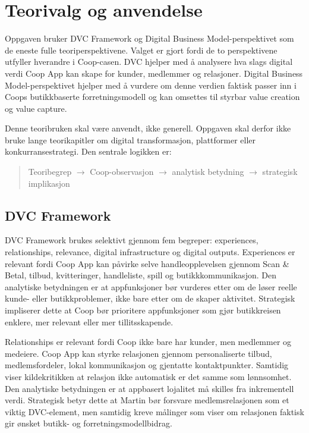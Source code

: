 \documentclass[12pt,a4paper]{article}
\begin{document}
\section{Teorivalg og anvendelse}

Oppgaven bruker DVC Framework og Digital Business Model-perspektivet som de eneste fulle teoriperspektivene. Valget er gjort fordi de to perspektivene utfyller hverandre i Coop-casen. DVC hjelper med å analysere hva slags digital verdi Coop App kan skape for kunder, medlemmer og relasjoner. Digital Business Model-perspektivet hjelper med å vurdere om denne verdien faktisk passer inn i Coops butikkbaserte forretningsmodell og kan omsettes til styrbar value creation og value capture.

Denne teoribruken skal være anvendt, ikke generell. Oppgaven skal derfor ikke bruke lange teorikapitler om digital transformasjon, plattformer eller konkurransestrategi. Den sentrale logikken er:

\begin{quote}
Teoribegrep $\rightarrow$ Coop-observasjon $\rightarrow$ analytisk betydning $\rightarrow$ strategisk implikasjon
\end{quote}

\subsection{DVC Framework}

DVC Framework brukes selektivt gjennom fem begreper: experiences, relationships, relevance, digital infrastructure og digital outputs. Experiences er relevant fordi Coop App kan påvirke selve handleopplevelsen gjennom Scan \& Betal, tilbud, kvitteringer, handleliste, spill og butikkkommunikasjon. Den analytiske betydningen er at appfunksjoner bør vurderes etter om de løser reelle kunde- eller butikkproblemer, ikke bare etter om de skaper aktivitet. Strategisk impliserer dette at Coop bør prioritere appfunksjoner som gjør butikkreisen enklere, mer relevant eller mer tillitsskapende.

Relationships er relevant fordi Coop ikke bare har kunder, men medlemmer og medeiere. Coop App kan styrke relasjonen gjennom personaliserte tilbud, medlemsfordeler, lokal kommunikasjon og gjentatte kontaktpunkter. Samtidig viser kildekritikken at relasjon ikke automatisk er det samme som lønnsomhet. Den analytiske betydningen er at appbasert lojalitet må skilles fra inkrementell verdi. Strategisk betyr dette at Martin bør forsvare medlemsrelasjonen som et viktig DVC-element, men samtidig kreve målinger som viser om relasjonen faktisk gir ønsket butikk- og forretningsmodellbidrag.
\end{document}
